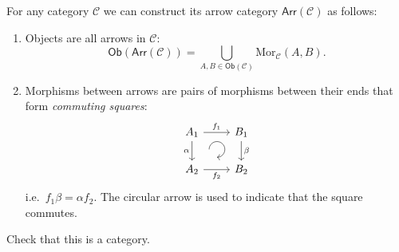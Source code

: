 %
\begin{defn}
For any category $\mathcal{C}$ we can construct its arrow category
$\mathsf{Arr}\left(\mathcal{C}\right)$ as follows:
\begin{enumerate}
\item Objects are all arrows in $\mathcal{C}$: 
\[
\mathsf{Ob}\left(\mathsf{Arr}\left(\mathcal{C}\right)\right)=\bigcup_{A,B\in\mathsf{Ob}\left(\mathcal{C}\right)}\mathrm{Mor}_{\mathcal{C}}\left(A,B\right).
\]
\item Morphisms between arrows are pairs of morphisms between their ends
that form \emph{commuting squares}:
\[
\begin{tikzcd}[every matrix/.append style={name=m},   
execute at end picture={\draw [<-] ([xshift=-2.2em,yshift=.3em]m-2-2.north) arc[start angle=-90,delta angle=270,radius=0.25cm];}]
   A_1\arrow[r,"f_1" ]\arrow[d,swap,"\alpha" ]& B_1 \arrow[d,"\beta" ] \\
   A_2\arrow[r,swap,"f_2" ]& B_2
\end{tikzcd}\]
i.e.\ $f_{1}\beta=\alpha f_{2}$. The circular arrow is used to indicate
that the square commutes. %
\end{enumerate}
\end{defn}
\begin{xca}
Check that this is a category.
\end{xca}
